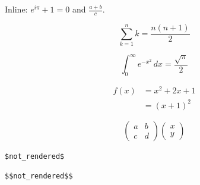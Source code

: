 \documentclass{article}
\begin{document}
Inline: $e^{i\pi} + 1 = 0$ and \(\frac{a+b}{c}\).

\[
\sum_{k=1}^{n} k = \frac{n(n+1)}{2}
\]

\begin{equation}
  \int_0^\infty e^{-x^2}\,dx = \frac{\sqrt{\pi}}{2}
\end{equation}

\begin{align*}
f(x) &= x^2 + 2x + 1 \\
     &= (x+1)^2
\end{align*}

\[
\begin{pmatrix} a & b \\ c & d \end{pmatrix}
\begin{pmatrix} x \\ y \end{pmatrix}
\]

\verb|$not_rendered$|
\begin{verbatim}
$$not_rendered$$
\end{verbatim}
\end{document}

